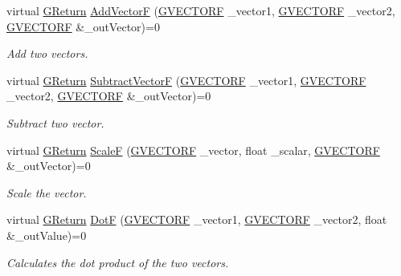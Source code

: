 \begin{DoxyCompactItemize}
\item 
virtual \hyperlink{namespaceGW_a67a839e3df7ea8a5c5686613a7a3de21}{G\+Return} \hyperlink{classGW_1_1MATH_1_1GVector_abed6b09d9bab25de229a16015899d682}{Add\+VectorF} (\hyperlink{structGW_1_1MATH_1_1GVECTORF}{G\+V\+E\+C\+T\+O\+RF} \+\_\+vector1, \hyperlink{structGW_1_1MATH_1_1GVECTORF}{G\+V\+E\+C\+T\+O\+RF} \+\_\+vector2, \hyperlink{structGW_1_1MATH_1_1GVECTORF}{G\+V\+E\+C\+T\+O\+RF} \&\+\_\+out\+Vector)=0
\begin{DoxyCompactList}\small\item\em Add two vectors. \end{DoxyCompactList}\item 
virtual \hyperlink{namespaceGW_a67a839e3df7ea8a5c5686613a7a3de21}{G\+Return} \hyperlink{classGW_1_1MATH_1_1GVector_af8f13c5379e21d4e569f476032d97518}{Subtract\+VectorF} (\hyperlink{structGW_1_1MATH_1_1GVECTORF}{G\+V\+E\+C\+T\+O\+RF} \+\_\+vector1, \hyperlink{structGW_1_1MATH_1_1GVECTORF}{G\+V\+E\+C\+T\+O\+RF} \+\_\+vector2, \hyperlink{structGW_1_1MATH_1_1GVECTORF}{G\+V\+E\+C\+T\+O\+RF} \&\+\_\+out\+Vector)=0
\begin{DoxyCompactList}\small\item\em Subtract two vector. \end{DoxyCompactList}\item 
virtual \hyperlink{namespaceGW_a67a839e3df7ea8a5c5686613a7a3de21}{G\+Return} \hyperlink{classGW_1_1MATH_1_1GVector_a91373ccef519452b52c2b820f312d494}{ScaleF} (\hyperlink{structGW_1_1MATH_1_1GVECTORF}{G\+V\+E\+C\+T\+O\+RF} \+\_\+vector, float \+\_\+scalar, \hyperlink{structGW_1_1MATH_1_1GVECTORF}{G\+V\+E\+C\+T\+O\+RF} \&\+\_\+out\+Vector)=0
\begin{DoxyCompactList}\small\item\em Scale the vector. \end{DoxyCompactList}\item 
virtual \hyperlink{namespaceGW_a67a839e3df7ea8a5c5686613a7a3de21}{G\+Return} \hyperlink{classGW_1_1MATH_1_1GVector_aaa041109e606595189932719588e0141}{DotF} (\hyperlink{structGW_1_1MATH_1_1GVECTORF}{G\+V\+E\+C\+T\+O\+RF} \+\_\+vector1, \hyperlink{structGW_1_1MATH_1_1GVECTORF}{G\+V\+E\+C\+T\+O\+RF} \+\_\+vector2, float \&\+\_\+out\+Value)=0
\begin{DoxyCompactList}\small\item\em Calculates the dot product of the two vectors. \end{DoxyCompactList}\item 

\end{DoxyCompactItemize}
